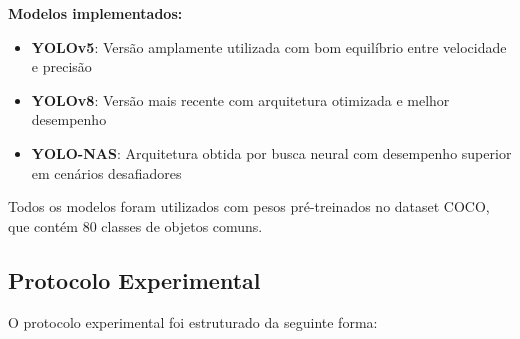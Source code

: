 \textbf{Modelos implementados:}
\begin{itemize}
    \item \textbf{YOLOv5}: Versão amplamente utilizada com bom equilíbrio entre velocidade e precisão
    \item \textbf{YOLOv8}: Versão mais recente com arquitetura otimizada e melhor desempenho
    \item \textbf{YOLO-NAS}: Arquitetura obtida por busca neural com desempenho superior em cenários desafiadores
\end{itemize}

Todos os modelos foram utilizados com pesos pré-treinados no dataset COCO, que contém 80 classes de objetos comuns.

\subsection{Protocolo Experimental}

O protocolo experimental foi estruturado da seguinte forma:

